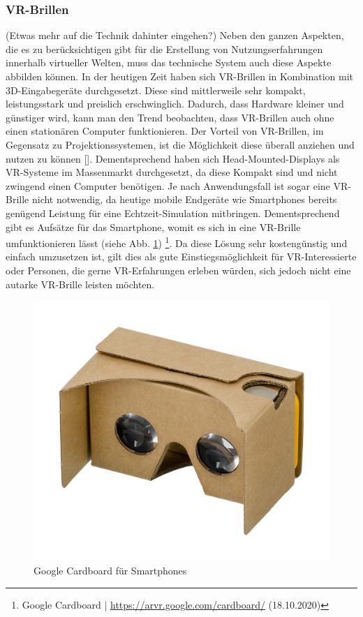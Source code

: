 \documentclass[a4paper,12pt,oneside]{article}
\begin{document}
      \subsubsection{VR-Brillen}
        (Etwas mehr auf die Technik dahinter eingehen?)
        Neben den ganzen Aspekten, die es zu berücksichtigen gibt für die Erstellung von
        Nutzungserfahrungen innerhalb virtueller Welten, muss das technische System auch
        diese Aspekte abbilden können. In der heutigen Zeit haben sich VR-Brillen in 
        Kombination mit 3D-Eingabegeräte durchgesetzt. Diese sind mittlerweile sehr kompakt,
        leistungsstark und preislich erschwinglich. Dadurch, dass Hardware kleiner
        und günstiger wird, kann man den Trend beobachten, dass VR-Brillen auch ohne
        einen stationären Computer funktionieren.
        Der Vorteil von VR-Brillen, im Gegensatz zu Projektionssystemen, ist die 
        Möglichkeit diese überall anziehen und nutzen zu können [\cite[129]{Dorner2019}].
        Dementsprechend haben sich Head-Mounted-Displays als VR-Systeme im Massenmarkt
        durchgesetzt, da diese Kompakt sind und nicht zwingend einen Computer benötigen.
        Je nach Anwendungsfall ist sogar eine VR-Brille nicht notwendig, da heutige 
        mobile Endgeräte wie Smartphones bereits genügend Leistung für eine 
        Echtzeit-Simulation mitbringen. Dementsprechend gibt es Aufsätze für das Smartphone,
        womit es sich in eine VR-Brille umfunktionieren lässt (siehe Abb. \ref{fig:google-cardboard})
        \footnote{Google Cardboard | \url{https://arvr.google.com/cardboard/} (18.10.2020)}.
        Da diese Lösung sehr kostengünstig und einfach umzusetzen ist, gilt dies als 
        gute Einstiegsmöglichkeit für VR-Interessierte oder Personen, die gerne
        VR-Erfahrungen erleben würden, sich jedoch nicht eine autarke VR-Brille leisten
        möchten.
        \begin{figure}[t]
          \centering
          \includegraphics{img/google-cardboard.jpg}
          \caption{Google Cardboard für Smartphones}
          \label{fig:google-cardboard}
        \end{figure}
\end{document}

